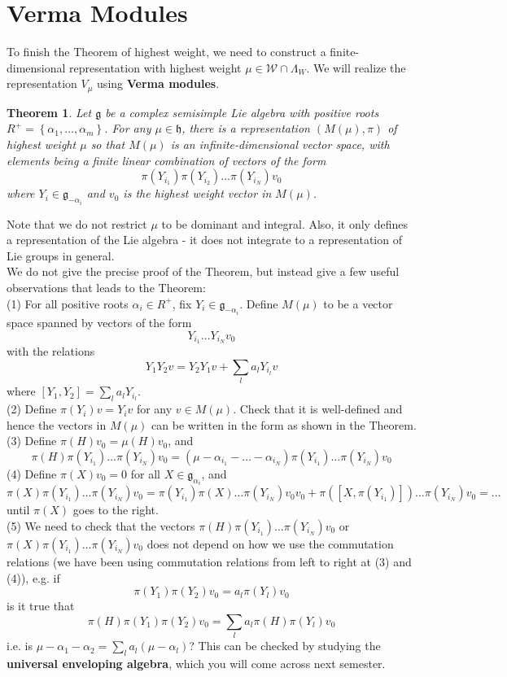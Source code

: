 \documentclass[11pt]{book}
\newtheorem{theorem}{Theorem}[section]
\newcommand{\mc}[1]{\mathcal{#1}}
\newcommand{\mf}[1]{\mathfrak{#1}}
\begin{document}
\section{Verma Modules}
To finish the Theorem of highest weight, we need to construct a finite-dimensional representation with highest weight $\mu \in \mc{W} \cap \Lambda_W$. We will realize the representation $V_{\mu}$ using \textbf{Verma modules}.
\begin{theorem}
Let $\mf{g}$ be a complex semisimple Lie algebra with positive roots $R^+ = \left\{\alpha_1, \dots, \alpha_m\right\}$. For any $\mu \in \mf{h}$, there is a representation $(M(\mu), \pi)$ of highest weight $\mu$ so that $M(\mu)$ is an infinite-dimensional vector space, with elements being a finite linear combination of vectors of the form
$$\pi(Y_{i_1})\pi(Y_{i_2})\dots \pi(Y_{i_N})v_0$$
where $Y_{i} \in \mf{g}_{-\alpha_i}$ and $v_0$ is the highest weight vector in $M(\mu)$.
\end{theorem}
\noindent Note that we do not restrict $\mu$ to be dominant and integral. Also, it only defines a representation of the Lie algebra - it does not integrate to a representation of Lie groups in general.\\
We do not give the precise proof of the Theorem, but instead give a few useful observations that leads to the Theorem:\\
(1) For all positive roots $\alpha_i \in R^+$, fix $Y_i \in \mf{g}_{-\alpha_i}$. Define $M(\mu)$ to be a vector space spanned by vectors of the form
$$Y_{i_1}\dots Y_{i_N}v_0$$
with the relations
$$Y_1Y_2v = Y_2Y_1v + \sum_l a_l Y_{i_l}v$$
where $[Y_1, Y_2] = \sum_l a_l Y_{i_l}$.\\
(2) Define $\pi(Y_i)v = Y_iv$ for any $v \in M(\mu)$. Check that it is well-defined and hence the vectors in $M(\mu)$ can be written in the form as shown in the Theorem.\\
(3) Define $\pi(H)v_0 = \mu(H)v_0$, and
$$\pi(H) \pi(Y_{i_1})\dots \pi(Y_{i_N})v_0 = (\mu - \alpha_{i_1} - \dots - \alpha_{i_N})\pi(Y_{i_1})\dots \pi(Y_{i_N})v_0 $$
(4) Define $\pi(X)v_0 = 0$ for all $X \in \mf{g}_{\alpha_i}$, and
$$\pi(X) \pi(Y_{i_1})\dots \pi(Y_{i_N})v_0 = \pi(Y_{i_1})\pi(X)\dots \pi(Y_{i_N})v_0v_0 + \pi([X,\pi(Y_{i_1})]) \dots \pi(Y_{i_N})v_0 = \dots$$
until $\pi(X)$ goes to the right.\\
(5) We need to check that the vectors $\pi(H) \pi(Y_{i_1})\dots \pi(Y_{i_N})v_0$ or $\pi(X) \pi(Y_{i_1})\dots \pi(Y_{i_N})v_0$ does not depend on how we use the commutation relations (we have been using commutation relations from left to right at (3) and (4)), e.g. if
$$\pi(Y_1)\pi(Y_2)v_0 = a_l \pi(Y_l)v_0$$
is it true that
$$\pi(H)\pi(Y_1)\pi(Y_2)v_0 = \sum_l a_l \pi(H)\pi(Y_l)v_0$$
i.e. is $\mu-\alpha_1 - \alpha_2 = \sum_l a_l (\mu - \alpha_l)$?
This can be checked by studying the \textbf{universal enveloping algebra}, which you will come across next semester.\\
\end{document}
